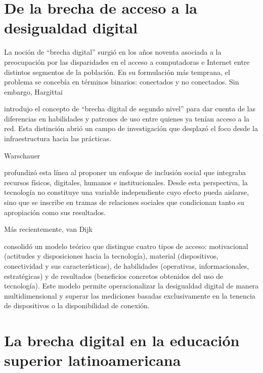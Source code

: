    


\section{De la brecha de acceso a la desigualdad digital}

    
    La noción de “brecha digital” surgió en los años noventa asociada a la preocupación por las disparidades en el acceso a computadoras e Internet entre distintos segmentos de la población. En su formulación más temprana, el problema se concebía en términos binarios: conectados y no conectados. Sin embargo, Hargittai 
    
    \autocite{2555-HARGITTAI2002}
    
     introdujo el concepto de “brecha digital de segundo nivel” para dar cuenta de las diferencias en habilidades y patrones de uso entre quienes ya tenían acceso a la red. Esta distinción abrió un campo de investigación que desplazó el foco desde la infraestructura hacia las prácticas.
   
   


    
    Warschauer 
    
    \autocite{2552-WARSCHAUER2004}
    
     profundizó esta línea al proponer un enfoque de inclusión social que integraba recursos físicos, digitales, humanos e institucionales. Desde esta perspectiva, la tecnología no constituye una variable independiente cuyo efecto pueda aislarse, sino que se inscribe en tramas de relaciones sociales que condicionan tanto su apropiación como sus resultados.
   
   


    
    Más recientemente, van Dijk 
    
    \autocite{2553-VANDIJK2020}
    
     consolidó un modelo teórico que distingue cuatro tipos de acceso: motivacional (actitudes y disposiciones hacia la tecnología), material (dispositivos, conectividad y sus características), de habilidades (operativas, informacionales, estratégicas) y de resultados (beneficios concretos obtenidos del uso de tecnología). Este modelo permite operacionalizar la desigualdad digital de manera multidimensional y superar las mediciones basadas exclusivamente en la tenencia de dispositivos o la disponibilidad de conexión.
   
   


\section{La brecha digital en la educación superior latinoamericana}

